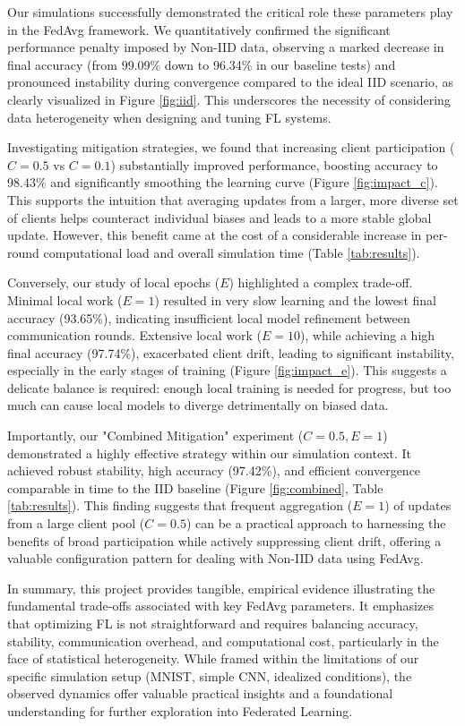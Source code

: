 \documentclass[conference]{IEEEtran}
\begin{document}
Our simulations successfully demonstrated the critical role these parameters play in the FedAvg framework. We quantitatively confirmed the significant performance penalty imposed by Non-IID data, observing a marked decrease in final accuracy (from 99.09\% down to 96.34\% in our baseline tests) and pronounced instability during convergence compared to the ideal IID scenario, as clearly visualized in Figure \ref{fig:iid}. This underscores the necessity of considering data heterogeneity when designing and tuning FL systems.

Investigating mitigation strategies, we found that increasing client participation ($C=0.5$ vs $C=0.1$) substantially improved performance, boosting accuracy to 98.43\% and significantly smoothing the learning curve (Figure \ref{fig:impact_c}). This supports the intuition that averaging updates from a larger, more diverse set of clients helps counteract individual biases and leads to a more stable global update. However, this benefit came at the cost of a considerable increase in per-round computational load and overall simulation time (Table \ref{tab:results}).

Conversely, our study of local epochs ($E$) highlighted a complex trade-off. Minimal local work ($E=1$) resulted in very slow learning and the lowest final accuracy (93.65\%), indicating insufficient local model refinement between communication rounds. Extensive local work ($E=10$), while achieving a high final accuracy (97.74\%), exacerbated client drift, leading to significant instability, especially in the early stages of training (Figure \ref{fig:impact_e}). This suggests a delicate balance is required: enough local training is needed for progress, but too much can cause local models to diverge detrimentally on biased data.

Importantly, our "Combined Mitigation" experiment ($C=0.5, E=1$) demonstrated a highly effective strategy within our simulation context. It achieved robust stability, high accuracy (97.42\%), and efficient convergence comparable in time to the IID baseline (Figure \ref{fig:combined}, Table \ref{tab:results}). This finding suggests that frequent aggregation ($E=1$) of updates from a large client pool ($C=0.5$) can be a practical approach to harnessing the benefits of broad participation while actively suppressing client drift, offering a valuable configuration pattern for dealing with Non-IID data using FedAvg.

In summary, this project provides tangible, empirical evidence illustrating the fundamental trade-offs associated with key FedAvg parameters. It emphasizes that optimizing FL is not straightforward and requires balancing accuracy, stability, communication overhead, and computational cost, particularly in the face of statistical heterogeneity. While framed within the limitations of our specific simulation setup (MNIST, simple CNN, idealized conditions), the observed dynamics offer valuable practical insights and a foundational understanding for further exploration into Federated Learning.
\end{document}
